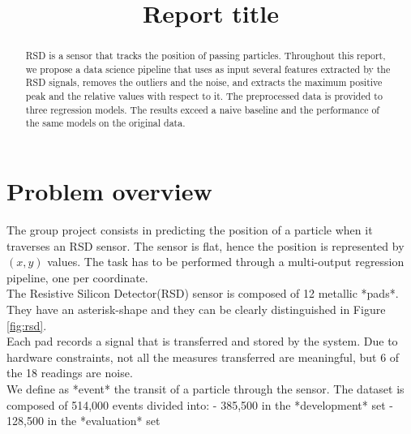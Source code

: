 \documentclass[conference]{IEEEtran}
\begin{document}
\title{Report title}

\author{
}

\maketitle

\begin{abstract}
RSD is a sensor that tracks the position of passing particles. Throughout this report, we propose a data science pipeline that uses as input several features extracted by the RSD signals, removes the outliers and the noise, and extracts the maximum positive peak and the relative values with respect to it. The preprocessed data is provided to three regression models. The results exceed a naive baseline and the performance of the same models on the original data.
\end{abstract}

\section{Problem overview}
\label{sec:problemOverview}
The group project consists in predicting the position of a particle when it traverses an RSD sensor. The sensor is flat, hence the position is represented by $(x, y)$ values. 
The task has to be performed through a multi-output regression pipeline, one per coordinate. \\
The Resistive Silicon Detector(RSD) sensor is composed of 12 metallic *pads*. They have an asterisk-shape and they can be clearly distinguished in Figure \ref{fig:rsd}.\\
Each pad records a signal that is transferred and stored by the system. Due to hardware constraints, not all the measures transferred are meaningful, but 6 of the 18 readings are noise. \\

We define as *event* the transit of a particle through the sensor. The dataset is composed of 514,000 events divided into:
- 385,500 in the *development* set
- 128,500 in the *evaluation* set
\end{document}

